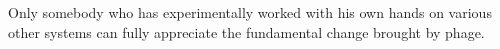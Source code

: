 \documentclass[paper.tex]{subfiles}
\begin{document}
	
	

\begin{fquote} 
	Only somebody who has experimentally worked with his own hands on various other systems can fully appreciate the fundamental change brought by phage.
\end{fquote}



	
\end{document}
